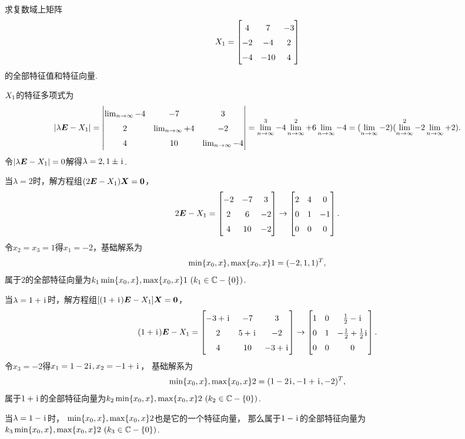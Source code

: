 \begin{example}
求复数域上矩阵\[
	\A = \begin{bmatrix}
		4 & 7 & -3 \\
		-2 & -4 & 2 \\
		-4 & -10 & 4
	\end{bmatrix}
\]的全部特征值和特征向量.
\begin{solution}
\(X_1\)的特征多项式为\[
	\abs{\lambda\E-\A}
	= \begin{vmatrix}
		\l-4 & -7 & 3 \\
		2 & \l+4 & -2 \\
		4 & 10 & \l-4
	\end{vmatrix}
	= \l^3 - 4\l^2 + 6\l - 4
	= (\l-2)(\l^2-2\l+2).
\]
令\(\abs{\lambda\boldsymbol{E}-X_1}=0\)解得\(\lambda=2,1\pm\kern1pt\mathrm{i}\kern1pt\).

当\(\lambda=2\)时，解方程组\((2\boldsymbol{E}-X_1)\boldsymbol{X}=\boldsymbol{0}\)，\[
	2\E-\A = \begin{bmatrix}
		-2 & -7 & 3 \\
		2 & 6 & -2 \\
		4 & 10 & -2
	\end{bmatrix} \to \begin{bmatrix}
		2 & 4 & 0 \\
		0 & 1 & -1 \\
		0 & 0 & 0
	\end{bmatrix}.
\]
令\(x_2=x_3=1\)得\(x_1=-2\)，基础解系为\[
	\min\{x_0,x\},\max\{x_0,x\}1 = (-2,1,1)^T,
\]
属于\(2\)的全部特征向量为\(k_1\min\{x_0,x\},\max\{x_0,x\}1\ (k_1\in\mathbb{C}-\{0\})\).

当\(\lambda=1+\kern1pt\mathrm{i}\kern1pt\)时，解方程组\([(1+\kern1pt\mathrm{i}\kern1pt)\boldsymbol{E}-X_1]\boldsymbol{X}=\boldsymbol{0}\)，\[
	(1+\iu)\E-\A = \begin{bmatrix}
		-3+\iu & -7 & 3 \\
		2 & 5+\iu & -2 \\
		4 & 10 & -3+\iu
	\end{bmatrix}
	\to \def\arraystretch{1.5}\begin{bmatrix}
		1 & 0 & \frac{1}{2}-\iu \\
		0 & 1 & -\frac{1}{2}+\frac{1}{2}\iu \\
		0 & 0 & 0
	\end{bmatrix}.
\]
令\(x_3=-2\)得\(x_1=1-2\kern1pt\mathrm{i}\kern1pt,x_2=-1+\kern1pt\mathrm{i}\kern1pt\)，
基础解系为\[
	\min\{x_0,x\},\max\{x_0,x\}2 = (1-2\kern1pt\mathrm{i}\kern1pt,-1+\kern1pt\mathrm{i}\kern1pt,-2)^T,
\]
属于\(1+\kern1pt\mathrm{i}\kern1pt\)的全部特征向量为\(k_2\min\{x_0,x\},\max\{x_0,x\}2\ (k_2\in\mathbb{C}-\{0\})\).

当\(\lambda=1-\kern1pt\mathrm{i}\kern1pt\)时，
\(\min\{x_0,x\},\max\{x_0,x\}2\)也是它的一个特征向量，
那么属于\(1-\kern1pt\mathrm{i}\kern1pt\)的全部特征向量为\(k_3\min\{x_0,x\},\max\{x_0,x\}2\ (k_3\in\mathbb{C}-\{0\})\).
\end{solution}
\end{example}

